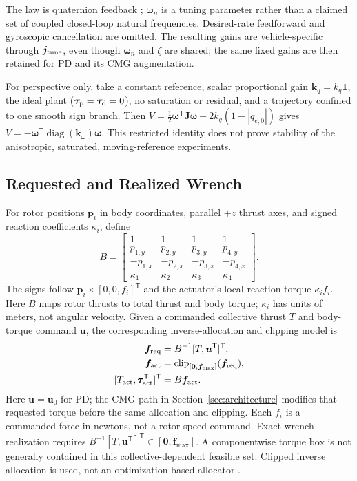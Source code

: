 \documentclass[letterpaper, 10 pt, conference]{ieeeconf}
\newcommand{\T}{^{\mathsf T}}
\newcommand{\clip}{\operatorname{clip}}
\begin{document}
The law is quaternion feedback \cite{fresk2013quaternion}; $\bm\omega_n$ is a tuning parameter rather than a claimed set of coupled closed-loop natural frequencies.
Desired-rate feedforward and gyroscopic cancellation are omitted.
The resulting gains are vehicle-specific through $\bm j_{\rm tune}$, even though
$\bm\omega_n$ and $\zeta$ are shared; the same fixed gains are then retained
for PD and its CMG augmentation.

For perspective only, take a constant reference, scalar proportional
gain $\bm k_q=k_q\bm1$, the ideal plant
($\bm\tau_{\rm p}=\bm\tau_{\rm d}=0$), no saturation or residual, and a
trajectory confined to one smooth sign branch. Then
$V=\frac12\bm\omega\T\bm J\bm\omega+2k_q(1-|q_{e,0}|)$ gives
$\dot V=-\bm\omega\T\operatorname{diag}(\bm k_\omega)\bm\omega$.
This restricted identity does not prove stability of the anisotropic,
saturated, moving-reference experiments.

\subsection{Requested and Realized Wrench}
For rotor positions $\bm p_i$ in body coordinates, parallel $+z$ thrust
axes, and signed reaction coefficients $\kappa_i$, define
\begin{equation}
 B=\begin{bmatrix}
 1&1&1&1\\p_{1,y}&p_{2,y}&p_{3,y}&p_{4,y}\\
 -p_{1,x}&-p_{2,x}&-p_{3,x}&-p_{4,x}\\
 \kappa_1&\kappa_2&\kappa_3&\kappa_4
 \end{bmatrix}.
 \label{eq:allocationmatrix}
\end{equation}
The signs follow $\bm p_i\times[0,0,f_i]\T$ and the actuator's local reaction torque $\kappa_i f_i$. Here $B$ maps rotor thrusts to total thrust and body torque; $\kappa_i$ has units of meters, not angular velocity. Given a commanded collective thrust $T$ and body-torque command $\bm u$, the corresponding inverse-allocation and clipping model is
\begin{equation}
 \begin{aligned}
 \bm f_{\rm req}&=B^{-1}[T,\bm u\T]\T,\\
 \bm f_{\rm act}&=\clip_{[\bm0,\bm f_{\max}]}(\bm f_{\rm req}),\\
 [T_{\rm act},\bm\tau_{\rm act}\T]\T&=B\bm f_{\rm act}.
 \end{aligned}
 \label{eq:mixer}
\end{equation}
Here $\bm u=\bm u_0$ for PD; the CMG path in Section~\ref{sec:architecture}
modifies that requested torque before the same allocation and clipping.
Each $f_i$ is a commanded force in newtons, not a rotor-speed command.
Exact wrench realization requires
$B^{-1}[T,\bm u\T]\T\in[\bm0,\bm f_{\max}]$.
A componentwise torque box is not generally contained in this
collective-dependent feasible set. Clipped inverse allocation is used,
not an optimization-based allocator \cite{monteiro2016allocation}.
\end{document}
